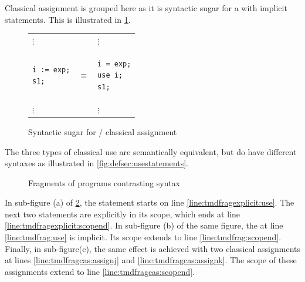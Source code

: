 Classical assignment is grouped here as it is syntactic sugar for a
 with implicit statements. This is illustrated in 
\ref{fig:useequalsassignment}.

\begin{figure}[htbp]
\begin{singlespace}
\begin{center}
\begin{tabular}{lcl}
$\vdots$ & & $\vdots$ \\
\begin{lstlisting}
i := exp;
s1;
\end{lstlisting} &
$\equiv$ &
\begin{lstlisting}
i = exp;
use i;
s1;
\end{lstlisting} \\
$\vdots$ & & $\vdots$
\end{tabular}
\end{center}
\end{singlespace}
\caption{Syntactic sugar for  / classical assignment}
\label{fig:useequalsassignment}
\end{figure}

The three types of classical use are semantically equivalent, but
do have different syntaxes as illustrated in \vref{fig:defsec:usestatements}.

\begin{figure}[htbp]
\centering
{}
\qquad
{}
\qquad
{}
\caption{Fragments of \lqpl{} programs contrasting  syntax}
\label{fig:defsec:usestatements}
\end{figure}

In sub-figure (a) of \ref{fig:defsec:usestatements}, the 
statement starts on line \ref{line:tmdfragexplicit:use}. The next two
statements are explicitly in its scope, which ends at line 
\ref{line:tmdfragexplicit:scopend}.  In sub-figure (b) of the same figure,
the  at line \ref{line:tmdfrag:use} is implicit. Its scope
extends to line \ref{line:tmdfrag:scopend}. Finally, in sub-figure(c),
the same effect is achieved with two classical assignments at 
lines \ref{line:tmdfragcas:assignj} and \ref{line:tmdfragcas:assignk}.
The scope of these assignments extend to line \ref{line:tmdfragcas:scopend}.


